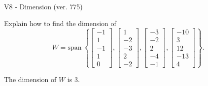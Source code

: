 \begin{exercise}
  \begin{exerciseTitle}V8 - Dimension (ver. 775)\end{exerciseTitle}
  \begin{exerciseStatement}
    Explain how to find the dimension of 
\[W=\mathrm{span}\ \left\{\left[\begin{array}{r}
-1 \\
1 \\
-1 \\
1 \\
0
\end{array}\right] , \left[\begin{array}{r}
1 \\
-2 \\
-3 \\
2 \\
-2
\end{array}\right] , \left[\begin{array}{r}
-3 \\
-2 \\
2 \\
-4 \\
-1
\end{array}\right] , \left[\begin{array}{r}
-10 \\
3 \\
12 \\
-13 \\
4
\end{array}\right]\right\}.\]



  \end{exerciseStatement}
  \begin{exerciseAnswer}
   The dimension of \(W\) is  \(3\).
  


  \end{exerciseAnswer}
\end{exercise}